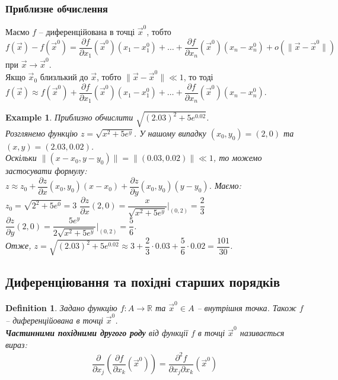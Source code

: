 \documentclass[a4paper, 10pt]{article}
\def\departial#1#2{\dfrac{\partial {#1}}{\partial {#2}}}
\theoremstyle{theoremdd}
\theoremstyle{theoremdd}
\theoremstyle{theoremdd}
\newtheorem{definition}[theorem]{Definition}
\theoremstyle{theoremdd}
\theoremstyle{theoremdd}
\newtheorem{example}[theorem]{Example}
\theoremstyle{theoremdd}
\theoremstyle{theoremdd}
\theoremstyle{theoremdd}
\theoremstyle{theoremdd}
\newcommand\Norm[1]{\|#1\|}
\begin{document}
\subsubsection{Приблизне обчислення}
Маємо $f$ -- диференційована в точці $\vec{x}^0$, тобто\\
$f(\vec{x}) - f(\vec{x}^0) = \departial{f}{x_1}(\vec{x}^0)(x_1-x_1^0) + \dots + \departial{f}{x_n}(\vec{x}^0)(x_n-x_n^0) + o(\Norm{\vec{x}-\vec{x}^0})$ при $\vec{x} \to \vec{x}^0$.\\
Якщо $\vec{x}_0$ близлький до $\vec{x}$, тобто $\Norm{\vec{x} - \vec{x}^0} \ll 1$, то тоді\\
$f(\vec{x}) \approx f(\vec{x}^0) + \departial{f}{x_1}(\vec{x}^0)(x_1-x_1^0) + \dots + \departial{f}{x_n}(\vec{x}^0)(x_n-x_n^0)$.

\begin{example}
Приблизно обчислити $\sqrt{(2.03)^2 + 5e^{0.02}}$.\\
Розглянемо функцію $z = \sqrt{x^2+5e^y}$. У нашому випадку $(x_0,y_0) = (2,0)$ та $(x,y) = (2.03,0.02)$.\\
Оскільки $\Norm{(x-x_0,y-y_0)} = \Norm{(0.03,0.02)} \ll 1$, то можемо застосувати формулу:\\
$z \approx z_0 + \departial{z}{x}(x_0,y_0)(x-x_0) + \departial{z}{y}(x_0,y_0)(y-y_0)$. Маємо: \\ $z_0 = \sqrt{2^2+5e^0} = 3$ \hspace{1cm} $\departial{z}{x}(2,0) = \dfrac{x}{\sqrt{x^2+5e^y}} \Big|_{(0,2)} = \dfrac{2}{3}$ \hspace{1cm} $\departial{z}{y}(2,0) = \dfrac{5e^y}{2\sqrt{x^2+5e^y}} \Big|_{(0,2)} = \dfrac{5}{6}$.\\
Отже, $z = \sqrt{(2.03)^2 + 5e^{0.02}} \approx 3 + \dfrac{2}{3} \cdot 0.03 + \dfrac{5}{6} \cdot 0.02 = \dfrac{101}{30}$.
\end{example}

\subsection{Диференціювання та похідні старших порядків}
\begin{definition}
Задано функцію $f\colon A \to \mathbb{R}$ та $\vec{x}^0 \in A$ -- внутрішня точка. Також $f$ -- диференційована в точці $\vec{x}^0$.\\
\textbf{Частинними похідними другого роду} від функції $f$ в точці $\vec{x}^0$ називається вираз:
\begin{align*}
\dfrac{\partial}{\partial x_j} \left( \dfrac{\partial f}{\partial x_k} (\vec{x}^0) \right) = \dfrac{\partial^2 f}{\partial x_j \partial x_k} (\vec{x}^0)
\end{align*}
\end{definition}
\end{document}
